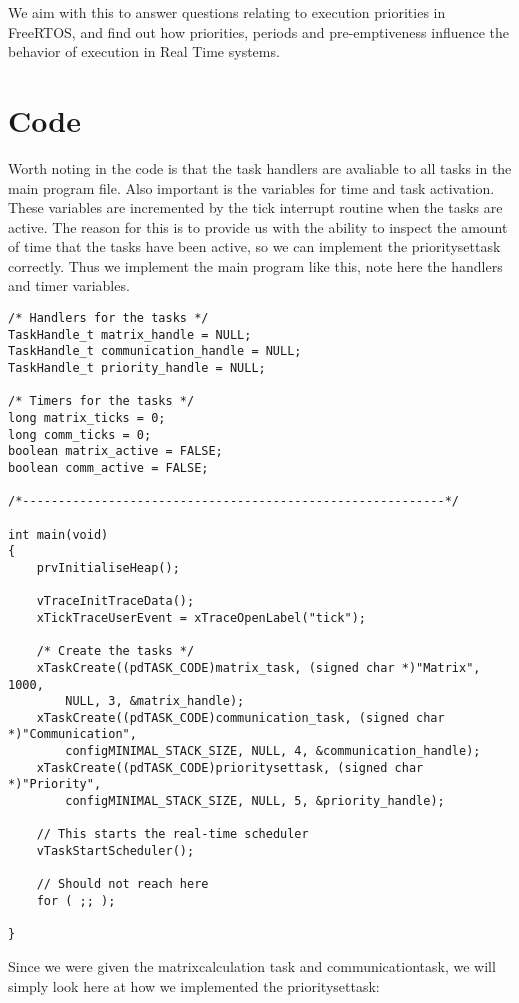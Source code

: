 \documentclass[12pt,fleqn,leqno,letterpaper]{article}
\begin{document}
        We aim with this to answer questions relating to execution priorities in FreeRTOS,
        and find out how priorities, periods and pre-emptiveness influence the behavior of
        execution in Real Time systems.

    \section*{Code}

        Worth noting in the code is that the task handlers are avaliable to all tasks in the main program file.
        Also important is the variables for time and task activation.  These variables are incremented by the
        tick interrupt routine when the tasks are active. The reason for this is to provide us with the ability
        to inspect the amount of time that the tasks have been active, so we can implement the prioritysettask correctly.
        Thus we implement the main program like this, note here the handlers and timer variables.

        \begin{verbatim}
/* Handlers for the tasks */
TaskHandle_t matrix_handle = NULL;
TaskHandle_t communication_handle = NULL;
TaskHandle_t priority_handle = NULL;

/* Timers for the tasks */
long matrix_ticks = 0;
long comm_ticks = 0;
boolean matrix_active = FALSE;
boolean comm_active = FALSE;

/*-----------------------------------------------------------*/

int main(void)
{
    prvInitialiseHeap();

    vTraceInitTraceData();
    xTickTraceUserEvent = xTraceOpenLabel("tick");

    /* Create the tasks */
    xTaskCreate((pdTASK_CODE)matrix_task, (signed char *)"Matrix", 1000,
        NULL, 3, &matrix_handle);
    xTaskCreate((pdTASK_CODE)communication_task, (signed char *)"Communication",
        configMINIMAL_STACK_SIZE, NULL, 4, &communication_handle);
    xTaskCreate((pdTASK_CODE)prioritysettask, (signed char *)"Priority",
        configMINIMAL_STACK_SIZE, NULL, 5, &priority_handle);

    // This starts the real-time scheduler
    vTaskStartScheduler();

    // Should not reach here
    for ( ;; );

}
        \end{verbatim}

        Since we were given the matrixcalculation task and communicationtask, we will simply
        look here at how we implemented the prioritysettask:
\end{document}
